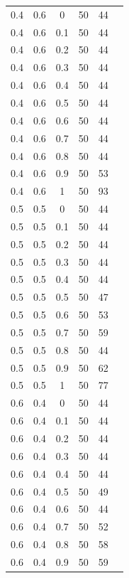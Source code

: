 \documentclass[12pt]{report}
\begin{document}
\begin{table}
\begin{minipage}[!h]{0.50\hsize}
\begin{center}
{\begin{tabular}{c@{\hspace{5mm}}c@{\hspace{5mm}}c@{\hspace{5mm}}c@{\hspace{5mm}}c@{\hspace{5mm}}c}
				0.4     &0.6    &0      &50    &44\\
				0.4     &0.6    &0.1    &50    &44\\
				0.4     &0.6    &0.2    &50    &44\\
				0.4     &0.6    &0.3    &50    &44\\
				0.4     &0.6    &0.4    &50    &44\\
				0.4     &0.6    &0.5    &50    &44\\
				0.4     &0.6    &0.6    &50    &44\\
				0.4     &0.6    &0.7    &50    &44\\
				0.4     &0.6    &0.8    &50    &44\\
				0.4     &0.6    &0.9    &50    &53\\
				0.4     &0.6    &1      &50     &93\\
				\midrule
				0.5     &0.5    &0      &50    &44\\
				0.5     &0.5    &0.1    &50    &44\\
				0.5     &0.5    &0.2    &50    &44\\
				0.5     &0.5    &0.3    &50    &44\\
				0.5     &0.5    &0.4    &50    &44\\
				0.5     &0.5    &0.5    &50    &47\\
				0.5     &0.5    &0.6    &50    &53\\
				0.5     &0.5    &0.7    &50    &59\\
				0.5     &0.5    &0.8    &50    &44\\
				0.5     &0.5    &0.9    &50   &62\\
				0.5     &0.5    &1      &50    &77\\
				\midrule
				0.6     &0.4    &0      &50    &44\\
				0.6     &0.4    &0.1    &50    &44\\
				0.6     &0.4    &0.2    &50    &44\\
				0.6     &0.4    &0.3    &50    &44\\
				0.6     &0.4    &0.4    &50    &44\\
				0.6     &0.4    &0.5    &50    &49\\
				0.6     &0.4    &0.6    &50    &44\\
				0.6     &0.4    &0.7    &50   &52\\
				0.6     &0.4    &0.8    &50    &58\\
				0.6     &0.4    &0.9    &50    &59\\

\end{tabular}}
\end{center}
\end{minipage}
\end{table}
\end{document}
